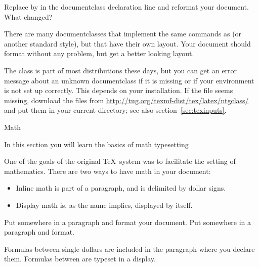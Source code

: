 \begin{exercise}
Replace  by  in the documentclass declaration line and
reformat your document. What changed?
\end{exercise}
\begin{outcome}
{There are many documentclasses that implement the same commands as
 (or another standard style), but that have their own
layout. Your document should format without any problem, but get a
better looking layout.}
\end{outcome}
\begin{caution}
{The  class is part of most distributions these days, but
you can get an error message about an unknown documentclass if it is
missing or if your environment is not set up correctly. This depends
on your installation. If the file seems missing, download the files
from \url{http://tug.org/texmf-dist/tex/latex/ntgclass/}
and put them in your current directory; see also section~\ref{sec:texinputs}.}
\end{caution}

 {Math}

\begin{purpose}
  In this section you will learn the basics of math typesetting
\end{purpose}

One of the goals of the original \TeX\ system was to facilitate the
setting of mathematics. There are two ways to have math in your
document:
\begin{itemize}
\item Inline math is part of a paragraph, and is delimited by dollar
  signs. 
\item Display math is, as the name implies, displayed by itself. 
\end{itemize}

\begin{exercise}
Put  somewhere in a paragraph and format your document.
Put  \n{\\[x+y\\]} somewhere in a paragraph and format.
\end{exercise}
\begin{outcome}
{Formulas between single dollars are included in the paragraph where
you declare them. Formulas between \n{\\[...\\]} are typeset in a
display.}
\end{outcome}

